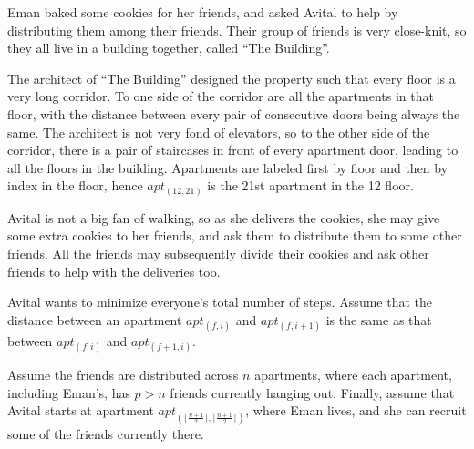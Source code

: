 \documentclass{hw}
\newcommand{\floor}[1]{\lfloor #1 \rfloor}
\begin{document}

\begin{problem}
  Eman baked some cookies for her friends, and asked Avital to help
  by distributing them among their friends. 
  Their group of friends is very close-knit, so they all live in a building 
  together, called ``The Building''.
  
  The architect of ``The Building'' designed 
  the property such that every floor is a very long corridor. To one side of 
  the corridor are all the apartments in that floor, with the distance between 
  every pair of consecutive doors being always the same.   
  The architect is not very fond of elevators, so to the other side of the 
  corridor, there is a pair of staircases in front of every apartment door,
  leading to all the floors in the building. 
  Apartments are labeled first by floor and then by index in the floor, hence 
  $apt_{(12,21)}$ is the 21st apartment in the 12 floor.

  Avital is not a big fan of walking, so as she delivers the cookies,
  she may give some extra cookies to her friends, and ask them to
  distribute them to some other friends. All the friends may subsequently
  divide their cookies and ask other friends to help with the deliveries too. 
  
  Avital wants to minimize everyone's total number of steps. Assume that the distance between an apartment $apt_{(f,i)}$ and $apt_{(f,i+1)}$ is the same as that between $apt_{(f,i)}$ and $apt_{(f+1,i)}$. 
  
  Assume the friends are distributed across $n$ apartments,
  where each apartment, including Eman's, has $p > n$ friends
  currently hanging out. 
  Finally, assume that Avital starts at apartment $apt_{(\floor{\frac{n+1}{2}},\floor{\frac{n+1}{2}})}$,
  where Eman lives, and she can recruit some of the friends currently there.


\end{problem}
\end{document}
